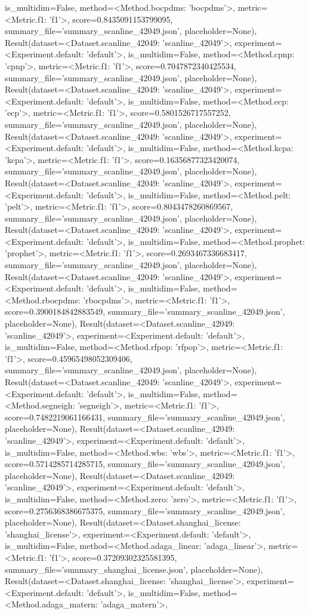is_multidim=False, method=<Method.bocpdms: 'bocpdms'>, metric=<Metric.f1: 'f1'>, score=0.8435091153799095, summary_file='summary_scanline_42049.json', placeholder=None), Result(dataset=<Dataset.scanline_42049: 'scanline_42049'>, experiment=<Experiment.default: 'default'>, is_multidim=False, method=<Method.cpnp: 'cpnp'>, metric=<Metric.f1: 'f1'>, score=0.7047872340425534, summary_file='summary_scanline_42049.json', placeholder=None), Result(dataset=<Dataset.scanline_42049: 'scanline_42049'>, experiment=<Experiment.default: 'default'>, is_multidim=False, method=<Method.ecp: 'ecp'>, metric=<Metric.f1: 'f1'>, score=0.5801526717557252, summary_file='summary_scanline_42049.json', placeholder=None), Result(dataset=<Dataset.scanline_42049: 'scanline_42049'>, experiment=<Experiment.default: 'default'>, is_multidim=False, method=<Method.kcpa: 'kcpa'>, metric=<Metric.f1: 'f1'>, score=0.16356877323420074, summary_file='summary_scanline_42049.json', placeholder=None), Result(dataset=<Dataset.scanline_42049: 'scanline_42049'>, experiment=<Experiment.default: 'default'>, is_multidim=False, method=<Method.pelt: 'pelt'>, metric=<Metric.f1: 'f1'>, score=0.8043478260869567, summary_file='summary_scanline_42049.json', placeholder=None), Result(dataset=<Dataset.scanline_42049: 'scanline_42049'>, experiment=<Experiment.default: 'default'>, is_multidim=False, method=<Method.prophet: 'prophet'>, metric=<Metric.f1: 'f1'>, score=0.2693467336683417, summary_file='summary_scanline_42049.json', placeholder=None), Result(dataset=<Dataset.scanline_42049: 'scanline_42049'>, experiment=<Experiment.default: 'default'>, is_multidim=False, method=<Method.rbocpdms: 'rbocpdms'>, metric=<Metric.f1: 'f1'>, score=0.3900184842883549, summary_file='summary_scanline_42049.json', placeholder=None), Result(dataset=<Dataset.scanline_42049: 'scanline_42049'>, experiment=<Experiment.default: 'default'>, is_multidim=False, method=<Method.rfpop: 'rfpop'>, metric=<Metric.f1: 'f1'>, score=0.45965498052309406, summary_file='summary_scanline_42049.json', placeholder=None), Result(dataset=<Dataset.scanline_42049: 'scanline_42049'>, experiment=<Experiment.default: 'default'>, is_multidim=False, method=<Method.segneigh: 'segneigh'>, metric=<Metric.f1: 'f1'>, score=0.7482219061166431, summary_file='summary_scanline_42049.json', placeholder=None), Result(dataset=<Dataset.scanline_42049: 'scanline_42049'>, experiment=<Experiment.default: 'default'>, is_multidim=False, method=<Method.wbs: 'wbs'>, metric=<Metric.f1: 'f1'>, score=0.5714285714285715, summary_file='summary_scanline_42049.json', placeholder=None), Result(dataset=<Dataset.scanline_42049: 'scanline_42049'>, experiment=<Experiment.default: 'default'>, is_multidim=False, method=<Method.zero: 'zero'>, metric=<Metric.f1: 'f1'>, score=0.2756368386675375, summary_file='summary_scanline_42049.json', placeholder=None), Result(dataset=<Dataset.shanghai_license: 'shanghai_license'>, experiment=<Experiment.default: 'default'>, is_multidim=False, method=<Method.adaga_linear: 'adaga_linear'>, metric=<Metric.f1: 'f1'>, score=0.37209302325581395, summary_file='summary_shanghai_license.json', placeholder=None), Result(dataset=<Dataset.shanghai_license: 'shanghai_license'>, experiment=<Experiment.default: 'default'>, is_multidim=False, method=<Method.adaga_matern: 'adaga_matern'>, 